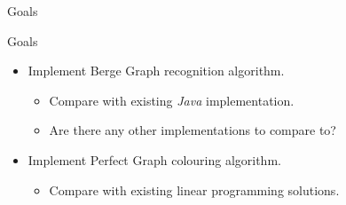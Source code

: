 \documentclass{beamer}
\begin{document}
\begin{frame}{Goals}
\begin{block}{Goals}
\begin{itemize}
\item Implement Berge Graph recognition algorithm.
\begin{itemize}
\item Compare with existing \emph{Java} implementation.
\item Are there any other implementations to compare to?
\end{itemize}
\item Implement Perfect Graph colouring algorithm.
\begin{itemize}
\item Compare with existing linear programming solutions.
\end{itemize}
\end{itemize}
\end{block}
\end{frame}
\end{document}
